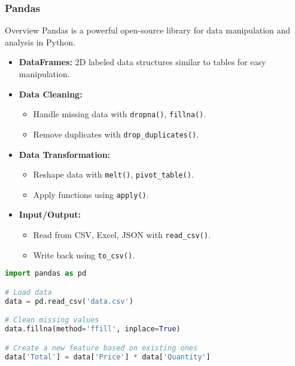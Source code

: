 \documentclass[aspectratio=169]{beamer}
\begin{document}
\begin{frame}[fragile]
    \frametitle{Pandas}
    \begin{block}{Overview}
        Pandas is a powerful open-source library for data manipulation and analysis in Python.
    \end{block}
    
    \begin{itemize}
        \item \textbf{DataFrames:} 2D labeled data structures similar to tables for easy manipulation.
        \item \textbf{Data Cleaning:}
            \begin{itemize}
                \item Handle missing data with \texttt{dropna()}, \texttt{fillna()}.
                \item Remove duplicates with \texttt{drop\_duplicates()}.
            \end{itemize}
        \item \textbf{Data Transformation:}
            \begin{itemize}
                \item Reshape data with \texttt{melt()}, \texttt{pivot\_table()}.
                \item Apply functions using \texttt{apply()}.
            \end{itemize}
        \item \textbf{Input/Output:}
            \begin{itemize}
                \item Read from CSV, Excel, JSON with \texttt{read\_csv()}.
                \item Write back using \texttt{to\_csv()}.
            \end{itemize}
    \end{itemize}
    
    \begin{lstlisting}[language=Python]
import pandas as pd

# Load data
data = pd.read_csv('data.csv')

# Clean missing values
data.fillna(method='ffill', inplace=True)

# Create a new feature based on existing ones
data['Total'] = data['Price'] * data['Quantity']
    \end{lstlisting}
\end{frame}
\end{document}
